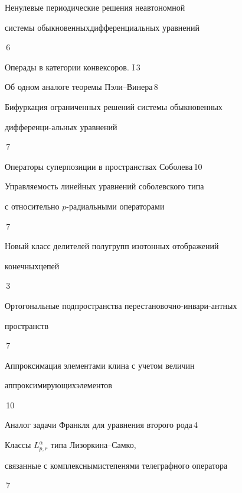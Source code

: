 

{Ненулевые периодические решения неавтономной


системы обыкновенных\newline дифференциальных уравнений}{\No\,6}




{Операды в категории конвексоров. I}{\No\,3}






{Об одном аналоге теоремы Пэли--Винера}{\No\,8}




{Бифуркация ограниченных решений системы обыкновенных 


дифференци-\newline альных уравнений}{\No\,7}




{Операторы суперпозиции в пространствах Соболева}{\No\,10}




{Управляемость линейных уравнений соболевского типа\newline


с относительно $p$-радиальными операторами}{\No\,7}




{Новый класс делителей полугрупп изотонных отображений


конечных\newline цепей}{\No\,3}




{Ортогональные подпространства перестановочно-инвари-\newline антных


пространств}{\No\,7}




{Аппроксимация элементами клина с учетом  величин 


аппроксимирующих\newline элементов}{\No\,10}




{Аналог задачи Франкля для уравнения второго рода}{\No\,4}




{Классы $L_{p,r}^\alpha$ типа Лизоркина--Самко, 


связанные с комплексными\newline степенями телеграфного оператора}{\No\,7}


